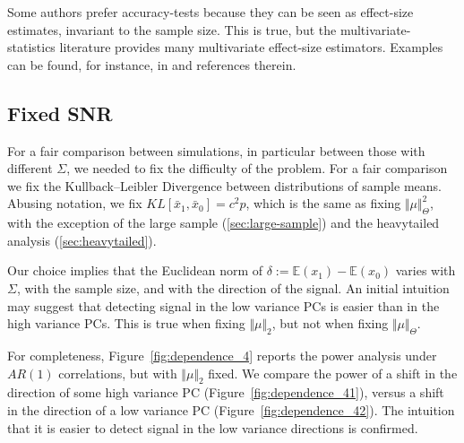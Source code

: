 \documentclass[]{bio}
\begin{document}
Some authors prefer accuracy-tests because they can be seen as effect-size estimates, invariant to the sample size. 
This is true, but the multivariate-statistics literature provides many multivariate effect-size estimators. 
Examples can be found, for instance, in \cite{stevens2012applied} and references therein. 




\subsection{Fixed SNR}
\label{sec:fix_snr}

For a fair comparison between simulations, in particular between those with different $\Sigma$, we needed to fix the difficulty of the problem.
For a fair comparison we fix the Kullback–Leibler Divergence between distributions of sample means. 
Abusing notation, we fix $KL[\bar x_1,\bar x_0]=c^2 p$, which is the same as fixing $\Vert \mu \Vert^2_\Theta$, with the exception of the large sample (\ref{sec:large-sample}) and the heavytailed analysis (\ref{sec:heavytailed}). 

Our choice implies that the Euclidean norm of $\delta:=\mathbb{E}(x_1)-\mathbb{E}(x_0)$ varies with $\Sigma$, with the sample size, and with the direction of the signal.
An initial intuition may suggest that detecting signal in the low variance PCs is easier than in the high variance PCs. 
This is true when fixing $\Vert \mu \Vert_2$, but not when fixing $\Vert \mu \Vert_{\Theta}$.

For completeness, Figure~\ref{fig:dependence_4} reports the power analysis under $AR(1)$ correlations, but with $\Vert \mu \Vert_2$ fixed.
We compare the power of a shift in the direction of some high variance PC (Figure~\ref{fig:dependence_41}), versus a shift in the direction of a low variance PC (Figure~\ref{fig:dependence_42}).
The intuition that it is easier to detect signal in the low variance directions is confirmed. 
\end{document}
